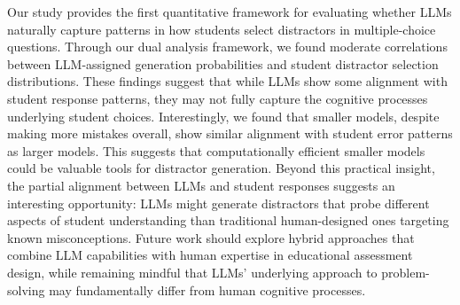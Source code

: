 Our study provides the first quantitative framework for evaluating whether LLMs naturally capture patterns in how students select distractors in multiple-choice questions. Through our dual analysis framework, we found moderate correlations between LLM-assigned generation probabilities and student distractor selection distributions. These findings suggest that while LLMs show some alignment with student response patterns, they may not fully capture the cognitive processes underlying student choices. Interestingly, we found that smaller models, despite making more mistakes overall, show similar alignment with student error patterns as larger models. This suggests that computationally efficient smaller models could be valuable tools for distractor generation. Beyond this practical insight, the partial alignment between LLMs and student responses suggests an interesting opportunity: LLMs might generate distractors that probe different aspects of student understanding than traditional human-designed ones targeting known misconceptions. Future work should explore hybrid approaches that combine LLM capabilities with human expertise in educational assessment design, while remaining mindful that LLMs' underlying approach to problem-solving may fundamentally differ from human cognitive processes.